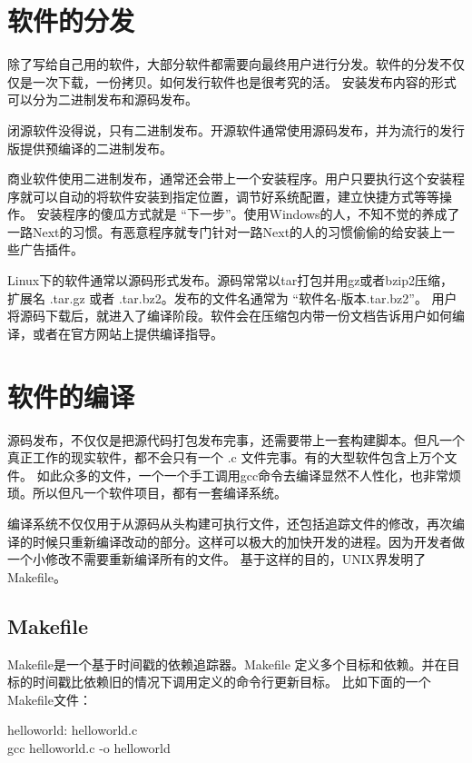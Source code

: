 
\section{软件的分发}

除了写给自己用的软件，大部分软件都需要向最终用户进行分发。软件的分发不仅仅是一次下载，一份拷贝。如何发行软件也是很考究的活。
安装发布内容的形式可以分为二进制发布和源码发布。

闭源软件没得说，只有二进制发布。开源软件通常使用源码发布，并为流行的发行版提供预编译的二进制发布。

商业软件使用二进制发布，通常还会带上一个安装程序。用户只要执行这个安装程序就可以自动的将软件安装到指定位置，调节好系统配置，建立快捷方式等等操作。
安装程序的傻瓜方式就是 “下一步”。使用Windows的人，不知不觉的养成了一路Next的习惯。有恶意程序就专门针对一路Next的人的习惯偷偷的给安装上一些广告插件。

Linux下的软件通常以源码形式发布。源码常常以tar打包并用gz或者bzip2压缩，扩展名 .tar.gz 或者 .tar.bz2。发布的文件名通常为 “软件名-版本.tar.bz2”。
用户将源码下载后，就进入了编译阶段。软件会在压缩包内带一份文档告诉用户如何编译，或者在官方网站上提供编译指导。

\section{软件的编译}
源码发布，不仅仅是把源代码打包发布完事，还需要带上一套构建脚本。但凡一个真正工作的现实软件，都不会只有一个 .c 文件完事。有的大型软件包含上万个文件。
如此众多的文件，一个一个手工调用gcc命令去编译显然不人性化，也非常烦琐。所以但凡一个软件项目，都有一套编译系统。

编译系统不仅仅用于从源码从头构建可执行文件，还包括追踪文件的修改，再次编译的时候只重新编译改动的部分。这样可以极大的加快开发的进程。因为开发者做一个小修改不需要重新编译所有的文件。
基于这样的目的，UNIX界发明了Makefile。

\subsection{Makefile}

Makefile是一个基于时间戳的依赖追踪器。Makefile 定义多个目标和依赖。并在目标的时间戳比依赖旧的情况下调用定义的命令行更新目标。
比如下面的一个Makefile文件：

\begin{code}
helloworld: helloworld.c\\
\qquad gcc helloworld.c -o helloworld
\end{code}

